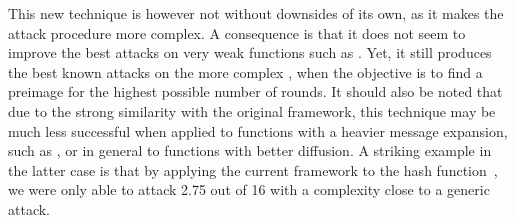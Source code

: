 This new technique is however not without downsides of its own, as it makes the attack procedure more complex. A consequence is
that it does not seem to improve the best attacks on very weak functions such as \mdfour. Yet, it still produces the best known
attacks on the more complex \shaone, when the objective is to find a preimage for the highest possible number of rounds.
It should also be noted that due to the strong similarity with the original \mitm framework, this technique may be
much less successful when applied to functions with a heavier message expansion, such as \shatwo, or in general to
functions with better diffusion. A striking example in the latter case is that by applying the current framework
to the  hash function~\cite{blake}, we were only able to attack 2.75 out of 16 with a complexity close to a generic attack. 

